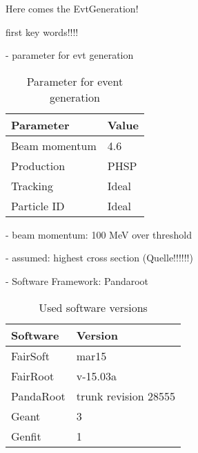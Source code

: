 Here comes the EvtGeneration!

\noindent first key words!!!!

- parameter for evt generation

\begin{table}[htbp]
	\caption{Parameter for event generation}
	\centering
	\begin{tabular}{ll}
		\hline
		Parameter & Value \\
		\hline
		\hline
		Beam momentum & 4.6 \massunit \\
		Production & PHSP \\
		Tracking & Ideal \\
		Particle ID & Ideal \\\hline
		 
	\end{tabular}
\end{table}

- beam momentum: 100 MeV over threshold

- assumed: highest cross section (Quelle!!!!!!)
 
- Software Framework: Pandaroot

\begin{table}[htb]
	\centering
	\caption{Used software versions}
	\begin{tabular}{ll}
		\hline
		Software & Version \\
		\hline
		\hline
		FairSoft & mar15\\
		FairRoot & v-15.03a \\
		PandaRoot & trunk revision 28555 \\
		Geant & 3\\
		Genfit & 1\\\hline
			 
	\end{tabular}
\end{table}
		
